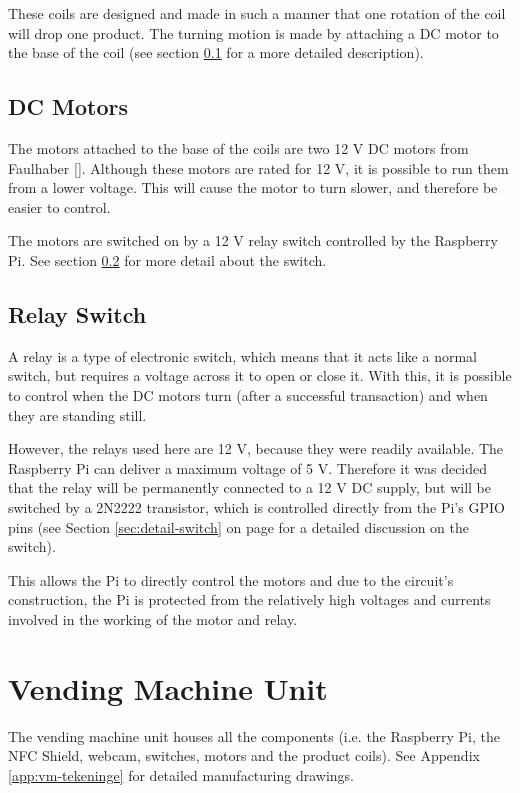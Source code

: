 These coils are designed and made in such a manner that one rotation of the coil will drop one
product. The turning motion is made by attaching a DC motor to the base of the coil (see
section \ref{sec:dc-motor} for a more detailed description).

\subsection{DC Motors}
\label{sec:dc-motor}

The motors attached to the base of the coils are two 12 V DC motors from Faulhaber
[\cite{manual:dc-motors}]. Although these motors are rated for 12 V, it is possible to run them
from a lower voltage. This will cause the motor to turn slower, and therefore be easier to
control. 

The motors are switched on by a 12 V relay switch controlled by the Raspberry Pi. See section
\ref{sec:relay-switch} for more detail about the switch.

\subsection{Relay Switch}
\label{sec:relay-switch}

A relay is a type of electronic switch, which means that it acts like a normal switch, but
requires a voltage across it to open or close it. With this, it is possible to control
when the DC motors turn (after a successful transaction) and when they are standing still. 

However, the relays used here are 12 V, because they were readily available. The Raspberry 
Pi can deliver a maximum voltage of 5 V. Therefore it was decided that the relay will be permanently
 connected to a 12 V DC supply, but will be switched by a 2N2222 transistor, which is 
controlled directly from the Pi's  GPIO pins (see Section \ref{sec:detail-switch} on page 
\pageref{sec:detail-switch} for a detailed discussion on the switch).

This allows the Pi to directly control the motors and due to the circuit's construction, the Pi
is protected from the relatively high voltages and currents involved in the working of the
motor and relay.

\section{Vending Machine Unit}

The vending machine unit houses all the components (i.e. the Raspberry Pi, the NFC Shield,
webcam, switches, motors and the product coils). See Appendix \ref{app:vm-tekeninge} 
for detailed manufacturing drawings.

